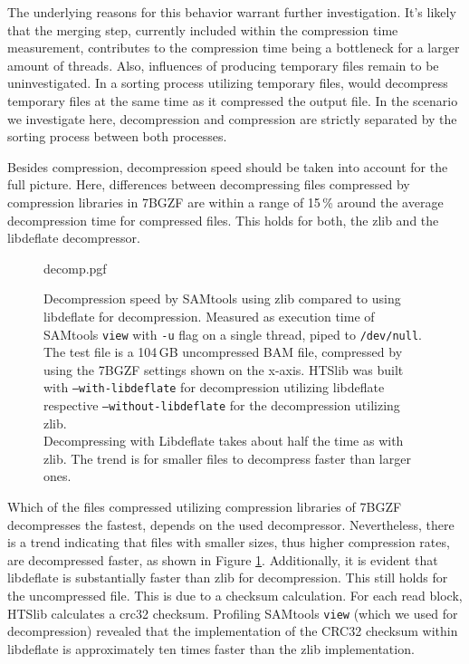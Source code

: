 The underlying reasons for this behavior warrant further investigation. It's likely that the merging step, currently included within the compression time measurement, contributes to the compression time being a bottleneck for a larger amount of threads. 
Also, influences of \sort producing temporary files remain to be uninvestigated. In a sorting process utilizing temporary files, \sort would decompress temporary files at the same time as it compressed the output file. In the scenario we investigate here, decompression and compression are strictly separated by the sorting process between both processes.


Besides compression, decompression speed should be taken into account for the full picture. Here, differences between decompressing files compressed by compression libraries in 7BGZF are within a range of 15\,\% around the average decompression time for compressed files. This holds for both, the zlib and the libdeflate decompressor.
\begin{figure}[htb]
        {decomp.pgf}
    \caption{Decompression speed by SAMtools using zlib compared to using libdeflate for decompression. Measured as execution time of SAMtools \texttt{view} with \texttt{-u} flag on a single thread, piped to \texttt{/dev/null}. The test file is a 104\,GB uncompressed BAM file, compressed by \sort using the 7BGZF settings shown on the x-axis. \parents \threads \points HTSlib was built with \texttt{--with-libdeflate} for decompression utilizing libdeflate respective \texttt{--without-libdeflate} for the decompression utilizing zlib.\\
    Decompressing with Libdeflate takes about half the time as with zlib. The trend is for smaller files to decompress faster than larger ones.}
    \label{fig:decomp}
\end{figure}

Which of the files compressed utilizing compression libraries of 7BGZF decompresses the fastest, depends on the used decompressor. Nevertheless, there is a trend indicating that files with smaller sizes, thus higher compression rates, are decompressed faster, as shown in Figure \ref{fig:decomp}. 
Additionally, it is evident that libdeflate is substantially faster than zlib for decompression. This still holds for the uncompressed file. This is due to a checksum calculation. For each read block, HTSlib calculates a crc32 checksum. Profiling SAMtools \texttt{view} (which we used for decompression) revealed that the implementation of the CRC32 checksum within libdeflate is approximately ten times faster than the zlib implementation.\\

